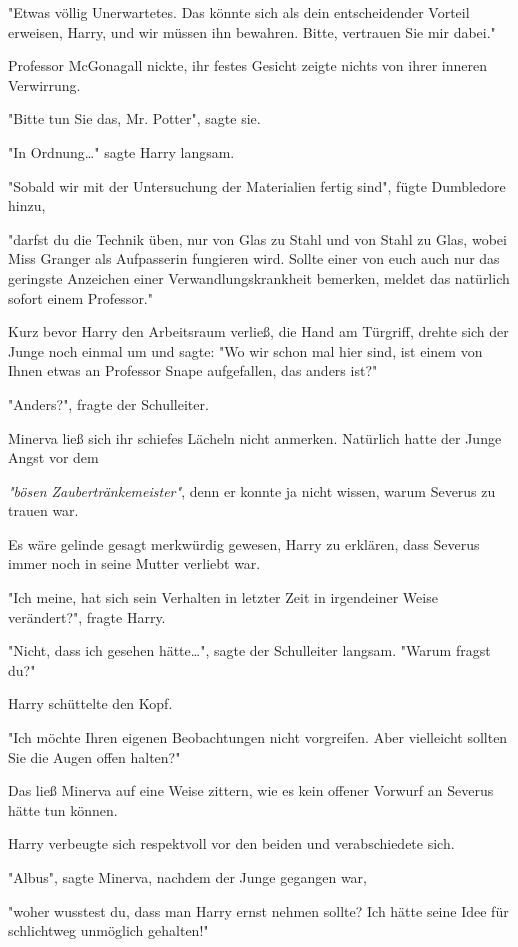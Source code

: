 {"Etwas völlig Unerwartetes. Das könnte sich als dein entscheidender Vorteil erweisen, Harry, und wir müssen ihn bewahren. Bitte, vertrauen Sie mir dabei."

Professor McGonagall nickte, ihr festes Gesicht zeigte nichts von ihrer inneren Verwirrung.

"Bitte tun Sie das, Mr. Potter", sagte sie.

"In Ordnung…" sagte Harry langsam.

"Sobald wir mit der Untersuchung der Materialien fertig sind", fügte Dumbledore hinzu,

"darfst du die Technik üben, nur von Glas zu Stahl und von Stahl zu Glas, wobei Miss Granger als Aufpasserin fungieren wird. Sollte einer von euch auch nur das geringste Anzeichen einer Verwandlungskrankheit bemerken, meldet das natürlich sofort einem Professor."

Kurz bevor Harry den Arbeitsraum verließ, die Hand am Türgriff, drehte sich der Junge noch einmal um und sagte: "Wo wir schon mal hier sind, ist einem von Ihnen etwas an Professor Snape aufgefallen, das anders ist?"

"Anders?", fragte der Schulleiter.

Minerva ließ sich ihr schiefes Lächeln nicht anmerken. Natürlich hatte der Junge Angst vor dem

\emph{"bösen Zaubertränkemeister"}, denn er konnte ja nicht wissen, warum Severus zu trauen war.

Es wäre gelinde gesagt merkwürdig gewesen, Harry zu erklären, dass Severus immer noch in seine Mutter verliebt war.

"Ich meine, hat sich sein Verhalten in letzter Zeit in irgendeiner Weise verändert?", fragte Harry.

"Nicht, dass ich gesehen hätte…", sagte der Schulleiter langsam. "Warum fragst du?"

Harry schüttelte den Kopf.

"Ich möchte Ihren eigenen Beobachtungen nicht vorgreifen. Aber vielleicht sollten Sie die Augen offen halten?"

Das ließ Minerva auf eine Weise zittern, wie es kein offener Vorwurf an Severus hätte tun können.

Harry verbeugte sich respektvoll vor den beiden und verabschiedete sich.

"Albus", sagte Minerva, nachdem der Junge gegangen war,

"woher wusstest du, dass man Harry ernst nehmen sollte? Ich hätte seine Idee für schlichtweg unmöglich gehalten!"

}

